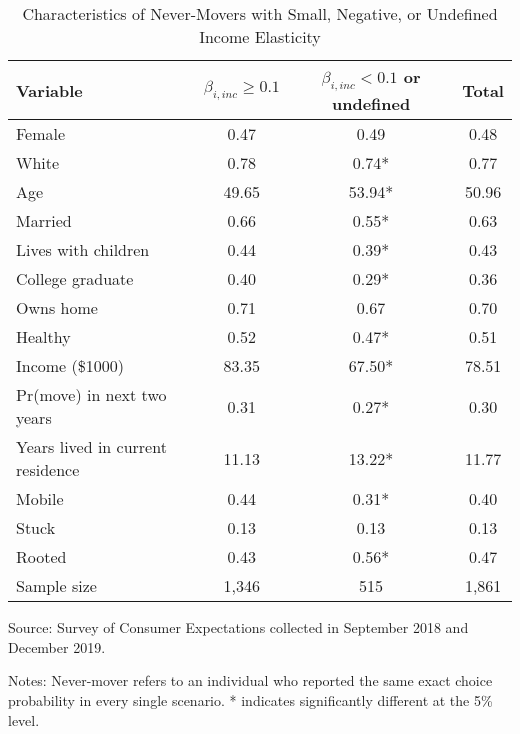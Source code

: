 \begin{table}[ht]
\caption{Characteristics of Never-Movers with Small, Negative, or Undefined Income Elasticity}
\label{tab:descBadInc}
\centering
\begin{threeparttable}
\begin{tabular}{lccc}
\toprule 
Variable & $\beta_{i,inc}\geq 0.1$ & $\beta_{i,inc}<0.1$ or undefined & Total \\
\midrule 
Female                                    & 0.47 & 0.49 & 0.48 \\ 
White                                     & 0.78 & 0.74* & 0.77 \\ 
Age                                       & 49.65 & 53.94* & 50.96 \\ 
Married                                   & 0.66 & 0.55* & 0.63 \\ 
Lives with children                       & 0.44 & 0.39* & 0.43 \\ 
College graduate                          & 0.40 & 0.29* & 0.36 \\ 
Owns home                                 & 0.71 & 0.67 & 0.70 \\ 
Healthy                                   & 0.52 & 0.47* & 0.51 \\ 
Income (\$1000)                          & 83.35 & 67.50* & 78.51 \\ 
Pr(move) in next two years                & 0.31 & 0.27* & 0.30 \\ 
Years lived in current residence          & 11.13 & 13.22* & 11.77 \\ 
Mobile                                    & 0.44 & 0.31* & 0.40 \\ 
Stuck                                     & 0.13 & 0.13 & 0.13 \\ 
Rooted                                    & 0.43 & 0.56* & 0.47 \\ 
\midrule 
Sample size                      & 1,346 &   515 & 1,861 \\ 
\bottomrule 
\end{tabular} 
\footnotesize{Source: Survey of Consumer Expectations collected in September 2018 and December 2019. 
 
\bigskip{} 
 
Notes: Never-mover refers to an individual who reported the same exact choice probability in every single scenario. * indicates significantly different at the 5\% level.}
\end{threeparttable} 
\end{table} 
